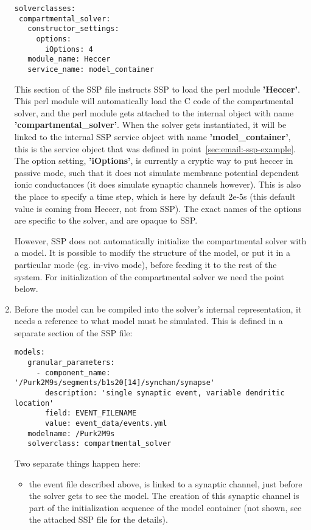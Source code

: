 \documentclass[12pt]{article}
\begin{document}
\begin{enumerate}
\begin{verbatim}
solverclasses:
 compartmental_solver:
   constructor_settings:
     options:
       iOptions: 4
   module_name: Heccer
   service_name: model_container
\end{verbatim}

  This section of the SSP file instructs SSP to load the perl module
  {\bf 'Heccer'}.  This perl module will automatically load the C code
  of the compartmental solver, and the perl module gets attached to
  the internal object with name {\bf 'compartmental\_solver'}.  When
  the solver gets instantiated, it will be linked to the internal SSP
  service object with name {\bf 'model\_container'}, this is the
  service object that was defined in
  point~\ref{sec:email:-ssp-example}.  The option setting, {\bf
    'iOptions'}, is currently a cryptic way to put heccer in passive
  mode, such that it does not simulate membrane potential dependent
  ionic conductances (it does simulate synaptic channels however).
  This is also the place to specify a time step, which is here by
  default 2e-5s (this default value is coming from Heccer, not from
  SSP).  The exact names of the options are specific to the solver,
  and are opaque to SSP.

  However, SSP does not automatically initialize the compartmental
  solver with a model.  It is possible to modify the structure of the
  model, or put it in a particular mode (eg. in-vivo mode), before
  feeding it to the rest of the system.  For initialization of the
  compartmental solver we need the point below.

\item Before the model can be compiled into the solver's internal
  representation, it needs a reference to what model must be
  simulated.  This is defined in a separate section of the SSP file:

\begin{verbatim}
models:
   granular_parameters:
     - component_name: '/Purk2M9s/segments/b1s20[14]/synchan/synapse'
       description: 'single synaptic event, variable dendritic location'
       field: EVENT_FILENAME
       value: event_data/events.yml
   modelname: /Purk2M9s
   solverclass: compartmental_solver
\end{verbatim}

  Two separate things happen here:

  \begin{itemize}
  \item the event file described above, is linked to a synaptic
    channel, just before the solver gets to see the model.  The
    creation of this synaptic channel is part of the initialization
    sequence of the model container (not shown, see the attached SSP
    file for the details).


\end{itemize}
\end{enumerate}
\end{document}
